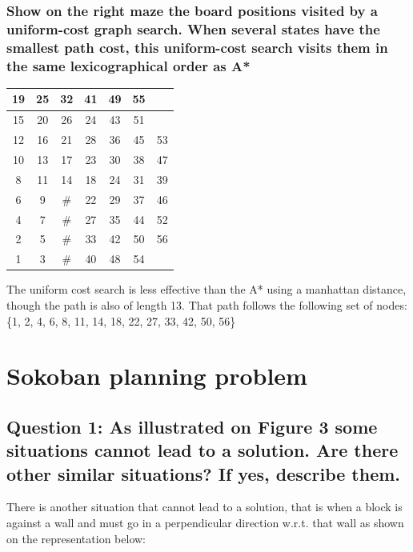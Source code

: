 \documentclass[a4paper,10pt]{article}
\begin{document}
			\subsubsection{Show on the right maze the board positions visited by a uniform-cost graph search. When several states have the smallest path cost, this uniform-cost search visits them in the same lexicographical order as A*}
			 \begin{center}
				\begin{tabular}{|c|c|c|c|c|c|c|}
					\hline 
					19 & 25 & 32 & 41 & 49 & 55 &    \\ 
					\hline 
					15 & 20 & 26 & 24 & 43 & 51 &    \\ 
					\hline 
					12 & 16 & 21 & 28 & 36 & 45 & 53 \\ 
					\hline 
					10 & 13 & 17 & 23 & 30 & 38 & 47 \\ 
					\hline 
					8  & 11 & 14 & 18 & 24 & 31 & 39 \\ 
					\hline 
					6  & 9  & \# & 22 & 29 & 37 & 46 \\ 
					\hline 
					4  & 7  & \# & 27 & 35 & 44 & 52 \\ 
					\hline 
					2  & 5  & \# & 33 & 42 & 50 & 56 \\ 
					\hline 
					1  & 3  & \# & 40 & 48 & 54 &    \\ 
					\hline 
				\end{tabular} 
			\end{center}
				The uniform cost search is less effective than the A* using a manhattan distance, though the path is also of length 13. That path follows the following set of nodes: \{1, 2, 4, 6, 8, 11, 14, 18, 22, 27, 33, 42, 50, 56\}
			
	\newpage
	
	\section{Sokoban planning problem}
	
		\subsection{Question 1: As illustrated on Figure 3 some situations cannot lead to a solution. Are there other similar situations? If yes, describe them.}
			
			There is another situation that cannot lead to a solution, that is when a block is against a wall and must go in a perpendicular direction w.r.t. that wall as shown on the representation below: \\
			
\end{document}
